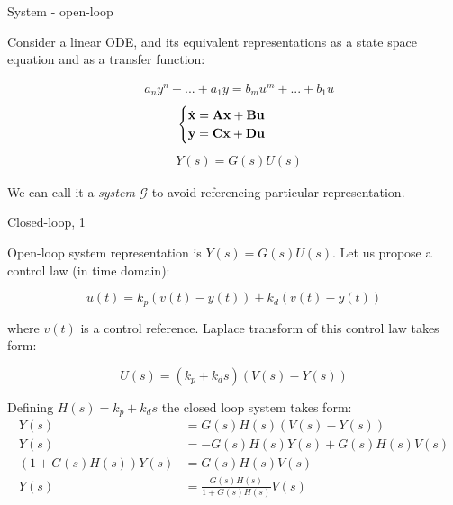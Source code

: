\documentclass{beamer}
\begin{document}
\begin{frame}{System - open-loop}
	\begin{flushleft}
		
		Consider a linear ODE, and its equivalent representations as a state space equation and as a transfer function:
		
		\begin{align}
			&a_n y^n + ... + a_1 y = b_m u^m + ... + b_1 u
		\end{align}
		\begin{align}
			&\begin{cases}
				\dot{\mathbf{x}} = \mathbf{A}\mathbf{x} + \mathbf{B}\mathbf{u} \\
				\mathbf{y}  = \mathbf{C}\mathbf{x} + \mathbf{D}\mathbf{u}
			\end{cases}
		\end{align}
		\begin{align}
			&Y(s)  = G(s) U(s)
		\end{align}
		
		We can call it a \emph{system} $\mathcal{G}$ to avoid referencing particular representation.
		
	\end{flushleft}
\end{frame}



\begin{frame}{Closed-loop, 1}
	\begin{flushleft}
		
		Open-loop system representation is $Y(s)  = G(s) U(s)$. Let us propose a control law (in time domain):
		
		\begin{equation}
			u(t) = k_p (v(t) - y(t)) + k_d (\dot v(t) - \dot y(t))
		\end{equation}
	
		where $v(t)$ is a control reference. Laplace transform of this control law takes form:
		
		\begin{equation}
			U(s) = (k_p + k_d s) (V(s) - Y(s))
		\end{equation}
		
		Defining $H(s) = k_p + k_d s$ the closed loop system takes form:
		\begin{align}
			Y(s)  &= G(s) H(s) (V(s) - Y(s)) \\
			Y(s)  &= -G(s) H(s) Y(s) + G(s) H(s)V(s) \\
		    (1 + G(s) H(s)) Y(s) &=  G(s) H(s)V(s) \\
		    Y(s) &= \frac{G(s) H(s)}{1 + G(s) H(s)} V(s)
		\end{align}
		
		
	\end{flushleft}
\end{frame}
\end{document}
